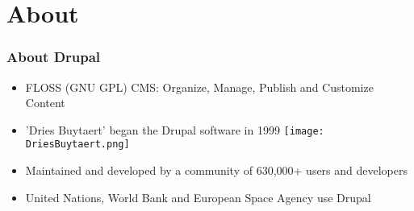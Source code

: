 \section{About}

\begin{frame}[allowframebreaks]
\frametitle{About Drupal}

\begin{itemize}
	\item FLOSS (GNU GPL) CMS: \linebreak
	Organize, Manage, Publish and Customize Content
	\item 'Dries Buytaert' began the Drupal software in 1999
	\linebreak 
	\texttt{[image: DriesBuytaert.png]}
	\item Maintained and developed by a community of 630,000+ users and developers
	\item United Nations, World Bank and European Space Agency use Drupal
\end{itemize}

\end{frame}
